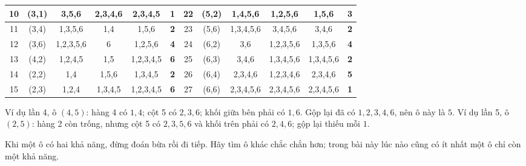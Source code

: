 {\begin{center}
\begin{tabular}{|c|c|c|c|c|c||c|c|c|c|c|c|}
10 & (3,1) & 3,5,6 & 2,3,4,6 & 2,3,4,5 & \textbf{1} & 22 & (5,2) & 1,4,5,6 & 1,2,5,6 & 1,5,6 & \textbf{3}\\ \hline
11 & (3,4) & 1,3,5,6 & 1,4 & 1,5,6 & \textbf{2} & 23 & (5,6) & 1,3,4,5,6 & 3,4,5,6 & 3,4,6 & \textbf{2}\\ \hline
12 & (3,6) & 1,2,3,5,6 & 6 & 1,2,5,6 & \textbf{4} & 24 & (6,2) & 3,6 & 1,2,3,5,6 & 1,3,5,6 & \textbf{4}\\ \hline
13 & (4,2) & 1,2,4,5 & 1,5 & 1,2,3,4,5 & \textbf{6} & 25 & (6,3) & 3,4,6 & 1,3,4,5,6 & 1,3,4,5,6 & \textbf{2}\\ \hline
14 & (2,2) & 1,4 & 1,5,6 & 1,3,4,5 & \textbf{2} & 26 & (6,4) & 2,3,4,6 & 1,2,3,4,6 & 2,3,4,6 & \textbf{5}\\ \hline
15 & (2,3) & 1,2,4 & 1,3,4,5 & 1,2,3,4,5 & \textbf{6} & 27 & (6,6) & 2,3,4,5,6 & 2,3,4,5,6 & 2,3,4,5,6 & \textbf{1}\\ \hline
\end{tabular}
\end{center}
Ví dụ lần 4, ô $(4,5)$: hàng 4 có $1, 4$; cột 5 có $2, 3, 6$; khối giữa bên phải có $1, 6$. Gộp lại đã có $1, 2, 3, 4, 6$, nên ô này
là $5$. Ví dụ lần 5, ô $(2,5)$: hàng 2 còn trống, nhưng cột 5 có $2, 3, 5, 6$ và khối trên phải có $2, 4, 6$; gộp lại thiếu mỗi
$1$.
\begin{figC}
\end{figC}
\begin{warnbox}Khi một ô có hai khả năng, đừng đoán bừa rồi đi tiếp. Hãy tìm ô khác chắc chắn hơn; trong bài này lúc nào cũng có
ít nhất một ô chỉ còn một khả năng.\end{warnbox}
}

